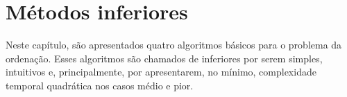 \chapter{Métodos inferiores}\label{cap:inferiores}
Neste capítulo, são apresentados quatro algoritmos básicos para o problema da ordenação. Esses algoritmos são chamados de inferiores por serem simples, intuitivos e, principalmente, por apresentarem, no mínimo, complexidade temporal quadrática nos casos médio e pior.




